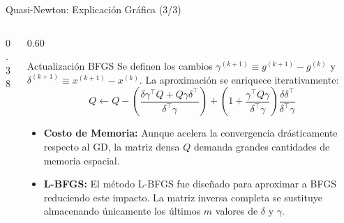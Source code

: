 \begin{frame}{Quasi-Newton: Explicación Gráfica (3/3)}
\begin{columns}[T]
\begin{column}{0.38\textwidth}
        \end{column}

        \scriptsize
        \begin{column}{0.60\textwidth}
            \begin{block}{Actualización BFGS}
                Se definen los cambios $\gamma^{(k+1)} \equiv g^{(k+1)} - g^{(k)}$ y $\delta^{(k+1)} \equiv x^{(k+1)} - x^{(k)}$. La aproximación se enriquece iterativamente:
                \vspace{-0.1cm}
                \[ Q \leftarrow Q - \left(\frac{\delta\gamma^\top Q + Q\gamma\delta^\top}{\delta^\top\gamma}\right) + \left(1 + \frac{\gamma^\top Q\gamma}{\delta^\top\gamma}\right)\frac{\delta\delta^\top}{\delta^\top\gamma} \]
            \end{block}
            
            \vspace{0.2cm}
            \begin{itemize}
                \setlength{\itemsep}{0.8em}
                \item \textbf{Costo de Memoria:} Aunque acelera la convergencia drásticamente respecto al GD, la matriz densa $Q$ demanda grandes cantidades de memoria espacial.
                \item \textbf{L-BFGS:} El método L-BFGS fue diseñado para aproximar a BFGS reduciendo este impacto. La matriz inversa completa se sustituye almacenando únicamente los últimos $m$ valores de $\delta$ y $\gamma$.
            \end{itemize}
        \end{column}
    \end{columns}
\end{frame}

